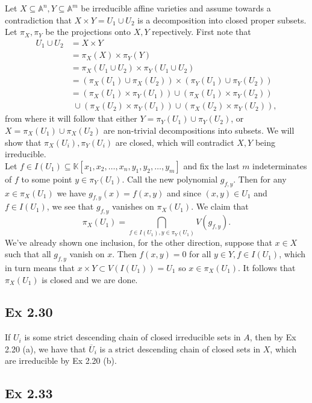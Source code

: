 \documentclass{article}
\theoremstyle{definition}
\newcommand{\K}{\mathbb{K}}
\newcommand{\A}{\mathbb{A}}
\newcommand{\An}{\A^n}
\newcommand{\Am}{\A^m}
\begin{document}
Let $X \subseteq \An, Y \subseteq \Am$ be irreducible affine varieties and
assume towards a contradiction that $X \times Y = U_1 \cup U_2$ is a
decomposition into closed proper subsets. Let $\pi_X, \pi_Y$ be the projections
onto $X, Y$ repectively. First note that
\begin{align*}
	U_1 \cup U_2
	&=
	X \times Y \\
	&=
	\pi_X(X) \times \pi_Y(Y) \\
	&=
	\pi_X(U_1 \cup U_2) \times \pi_Y(U_1 \cup U_2) \\
	&=
	(\pi_X(U_1) \cup \pi_X(U_2)) \times (\pi_Y(U_1) \cup \pi_Y(U_2)) \\
	&= 
	(\pi_X(U_1) \times \pi_Y(U_1))
	\cup 
	(\pi_X(U_1) \times \pi_Y(U_2)) \\
	&\,\, \cup 
	(\pi_X(U_2) \times \pi_Y(U_1))
	\cup 
	(\pi_X(U_2) \times \pi_Y(U_2)),
\end{align*}
from where it will follow that either $Y = \pi_Y(U_1) \cup \pi_Y(U_2)$, or $X =
\pi_X(U_1) \cup \pi_X(U_2)$ are non-trivial decompositions into subsets. We
will show that $\pi_X(U_i), \pi_Y(U_i)$ are closed, which will contradict $X,
Y$ being irreducible. \\

Let $f \in I(U_1) \subseteq \K[x_1, x_2, \ldots, x_n, y_1, y_2, \ldots, y_m]$
and fix the last $m$ indeterminates of $f$ to some point $y \in \pi_Y(U_1)$.
Call the new polynomial $g_{f, y}$. Then for any $x \in \pi_X(U_1)$ we have
$g_{f, y}(x) = f(x, y)$ and since $(x, y) \in U_1$ and $f \in I(U_1)$, we see
that $g_{f, y}$ vanishes on $\pi_X(U_1)$. We claim that
\[
	\pi_X(U_1) 
	= 
	\bigcap_{f \in I(U_1), y \in \pi_Y(U_1)}
	V
	\left( g_{f, y}\right).
\] 
We've already shown one inclusion, for the other direction, suppose that $x \in
X$ such that all $g_{f, y}$ vanish on $x$. Then $f(x, y) = 0$ for all $y \in Y,
f \in I(U_1)$, which in turn means that $x \times Y \subset V(I(U_1)) = U_1$ so
$x \in \pi_X(U_1)$. It follows that $\pi_X(U_1)$ is closed and we are done.

\subsection*{Ex 2.30} 
If $U_i$ is some strict descending chain of closed irreducible sets in $A$,
then by Ex 2.20 (a), we have that $\overline{U}_i$ is a strict descending chain
of closed sets in $X$, which are irreducible by Ex 2.20 (b).

\subsection*{Ex 2.33} 
\end{document}
